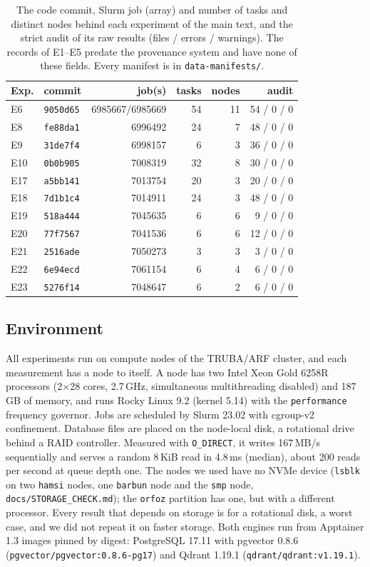 \documentclass[sigconf, nonacm]{acmart}
\begin{document}
\begin{table}[t]
  \caption{The code commit, Slurm job (array) and number of tasks and distinct nodes behind each experiment of the main text, and the strict
  audit of its raw results (files / errors / warnings). The records of E1--E5 predate the provenance system and have none of these fields.
  Every manifest is in \texttt{data-manifests/}.}
  \label{tab:commits}
  \small
  \begin{tabular}{@{}llrrrr@{}}
    \toprule
    Exp. & commit & job(s) & tasks & nodes & audit \\
    \midrule
    E6 & \texttt{9050d65} & 6985667/6985669 & 54 & 11 & 54 / 0 / 0 \\
    E8 & \texttt{fe88da1} & 6996492 & 24 & 7 & 48 / 0 / 0 \\
    E9 & \texttt{31de7f4} & 6998157 & 6 & 3 & 36 / 0 / 0 \\
    E10 & \texttt{0b0b905} & 7008319 & 32 & 8 & 30 / 0 / 0 \\
    E17 & \texttt{a5bb141} & 7013754 & 20 & 3 & 20 / 0 / 0 \\
    E18 & \texttt{7d1b1c4} & 7014911 & 24 & 3 & 48 / 0 / 0 \\
    E19 & \texttt{518a444} & 7045635 & 6 & 6 & 9 / 0 / 0 \\
    E20 & \texttt{77f7567} & 7041536 & 6 & 6 & 12 / 0 / 0 \\
    E21 & \texttt{2516ade} & 7050273 & 3 & 3 & 3 / 0 / 0 \\
    E22 & \texttt{6e94ecd} & 7061154 & 6 & 4 & 6 / 0 / 0 \\
    E23 & \texttt{5276f14} & 7048647 & 6 & 2 & 6 / 0 / 0 \\
    \bottomrule
  \end{tabular}
\end{table}

\subsection{Environment}

All experiments run on compute nodes of the TRUBA/ARF cluster, and each measurement has
a node to itself. A node has two Intel Xeon Gold 6258R processors (2$\times$28 cores,
2.7\,GHz, simultaneous multithreading disabled) and 187\,GB of memory, and runs Rocky
Linux 9.2 (kernel 5.14) with the \texttt{performance} frequency governor. Jobs are
scheduled by Slurm 23.02 with cgroup-v2 confinement. Database files are placed on the
node-local disk, a rotational drive behind a RAID controller. Measured with
\texttt{O\_DIRECT}, it writes 167\,MB/s sequentially and serves a random 8\,KiB read in
4.8\,ms (median), about 200 reads per second at queue depth one. The nodes we used have no NVMe device (\texttt{lsblk} on two \texttt{hamsi} nodes, one \texttt{barbun} node and the \texttt{smp} node, \texttt{docs/STORAGE\_CHECK.md}); the \texttt{orfoz} partition has one, but with a different processor. Every result that depends on storage is for a rotational disk, a worst case, and we did not repeat it on faster storage. Both engines run from Apptainer 1.3 images pinned by digest:
PostgreSQL 17.11 with pgvector 0.8.6 (\texttt{pgvector/pgvector:0.8.6-pg17}) and Qdrant
1.19.1 (\texttt{qdrant/qdrant:v1.19.1}).
\end{document}
